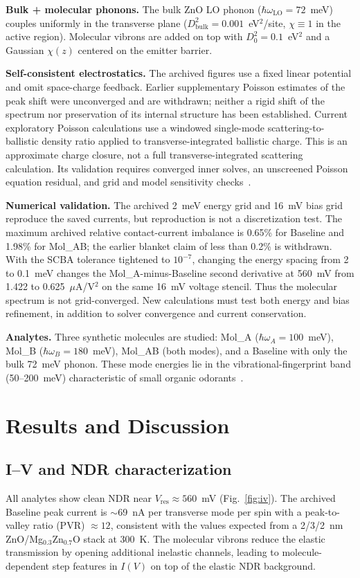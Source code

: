 \documentclass[conference]{IEEEtran}
\begin{document}
\textbf{Bulk + molecular phonons.} The bulk ZnO LO phonon ($\hbar\omega_{\mathrm{LO}} = 72$~meV) couples uniformly in the transverse plane ($D_{\mathrm{bulk}}^2 = 0.001$~eV$^2$/site, $\chi \equiv 1$ in the active region). Molecular vibrons are added on top with $D_0^2 = 0.1$~eV$^2$ and a Gaussian $\chi(z)$ centered on the emitter barrier. 

\textbf{Self-consistent electrostatics.} The archived figures use a fixed linear potential and omit space-charge feedback. Earlier supplementary Poisson estimates of the peak shift were unconverged and are withdrawn; neither a rigid shift of the spectrum nor preservation of its internal structure has been established. Current exploratory Poisson calculations use a windowed single-mode scattering-to-ballistic density ratio applied to transverse-integrated ballistic charge. This is an approximate charge closure, not a full transverse-integrated scattering calculation. Its validation requires converged inner solves, an unscreened Poisson equation residual, and grid and model sensitivity checks~\cite{lake1997}.

\textbf{Numerical validation.} The archived 2~meV energy grid and 16~mV bias grid reproduce the saved currents, but reproduction is not a discretization test. The maximum archived relative contact-current imbalance is 0.65\% for Baseline and 1.98\% for Mol\_AB; the earlier blanket claim of less than 0.2\% is withdrawn. With the SCBA tolerance tightened to $10^{-7}$, changing the energy spacing from 2 to 0.1~meV changes the Mol\_A-minus-Baseline second derivative at 560~mV from 1.422 to 0.625~$\mu$A/V$^2$ on the same 16~mV voltage stencil. Thus the molecular spectrum is not grid-converged. New calculations must test both energy and bias refinement, in addition to solver convergence and current conservation.

\textbf{Analytes.} Three synthetic molecules are studied: Mol\_A ($\hbar\omega_A = 100$~meV), Mol\_B ($\hbar\omega_B = 180$~meV), Mol\_AB (both modes), and a Baseline with only the bulk 72~meV phonon. These mode energies lie in the vibrational-fingerprint band (50--200~meV) characteristic of small organic odorants~\cite{pandey2021}.

\section{Results and Discussion}

\subsection{I--V and NDR characterization}
All analytes show clean NDR near $V_{\mathrm{res}} \approx 560$~mV (Fig.~\ref{fig:iv}). The archived Baseline peak current is $\sim$69~nA per transverse mode per spin with a peak-to-valley ratio (PVR) $\approx 12$, consistent with the values expected from a 2/3/2~nm ZnO/Mg$_{0.3}$Zn$_{0.7}$O stack at 300~K. The molecular vibrons reduce the elastic transmission by opening additional inelastic channels, leading to molecule-dependent step features in $I(V)$ on top of the elastic NDR background.
\end{document}
